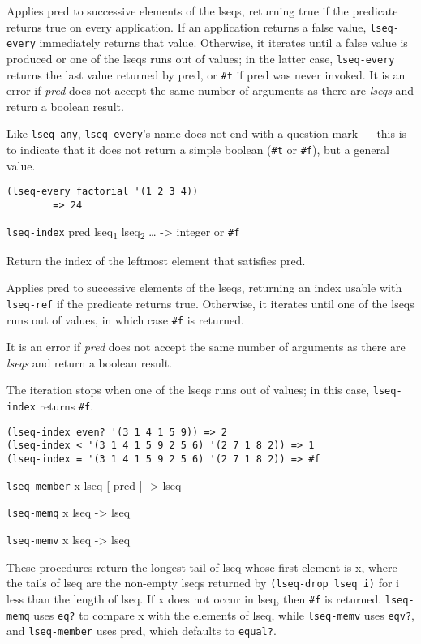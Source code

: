 Applies pred to successive elements of the lseqs, returning true if the
predicate returns true on every application. If an application returns a
false value, \texttt{lseq-every} immediately returns that value.
Otherwise, it iterates until a false value is produced or one of the
lseqs runs out of values; in the latter case, \texttt{lseq-every}
returns the last value returned by pred, or \texttt{\#t} if pred was
never invoked. It is an error if \emph{pred} does not accept the same
number of arguments as there are \emph{lseqs} and return a boolean
result.

Like \texttt{lseq-any}, \texttt{lseq-every}'s name does not end with a
question mark --- this is to indicate that it does not return a simple
boolean (\texttt{\#t} or \texttt{\#f}), but a general value.

\begin{verbatim}
(lseq-every factorial '(1 2 3 4))
        => 24
\end{verbatim}

\href{}{} \texttt{lseq-index} pred lseq\textsubscript{1}
lseq\textsubscript{2} \ldots{} -\textgreater{} integer or \texttt{\#f}

Return the index of the leftmost element that satisfies pred.

Applies pred to successive elements of the lseqs, returning an index
usable with \texttt{lseq-ref} if the predicate returns true. Otherwise,
it iterates until one of the lseqs runs out of values, in which case
\texttt{\#f} is returned.

It is an error if \emph{pred} does not accept the same number of
arguments as there are \emph{lseqs} and return a boolean result.

The iteration stops when one of the lseqs runs out of values; in this
case, \texttt{lseq-index} returns \texttt{\#f}.

\begin{verbatim}
(lseq-index even? '(3 1 4 1 5 9)) => 2
(lseq-index < '(3 1 4 1 5 9 2 5 6) '(2 7 1 8 2)) => 1
(lseq-index = '(3 1 4 1 5 9 2 5 6) '(2 7 1 8 2)) => #f
\end{verbatim}

\href{}{} \texttt{lseq-member} x lseq {[} pred {]} -\textgreater{} lseq

\href{}{} \texttt{lseq-memq} x lseq -\textgreater{} lseq

\href{}{} \texttt{lseq-memv} x lseq -\textgreater{} lseq

These procedures return the longest tail of lseq whose first element is
x, where the tails of lseq are the non-empty lseqs returned by
\texttt{(lseq-drop\ lseq\ i)} for i less than the length of lseq. If x
does not occur in lseq, then \texttt{\#f} is returned.
\texttt{lseq-memq} uses \texttt{eq?} to compare x with the elements of
lseq, while \texttt{lseq-memv} uses \texttt{eqv?}, and
\texttt{lseq-member} uses pred, which defaults to \texttt{equal?}.

